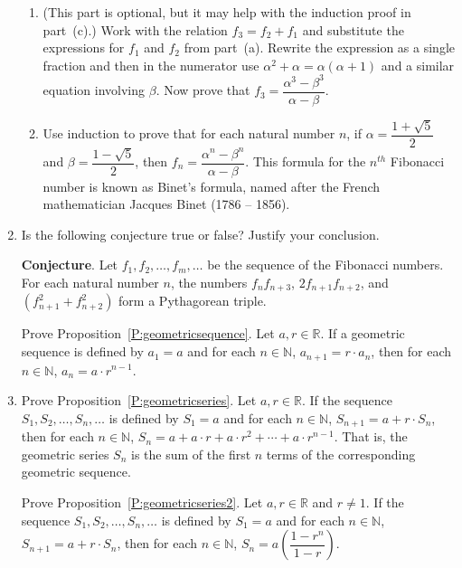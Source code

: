 \begin{enumerate}
\begin{enumerate}
  \item (This part is optional, but it may help with the induction proof in part~(c).)  Work with the relation $f_3 = f_2 + f_1$ and substitute the expressions for $f_1$ and $f_2$ from part~(a).  Rewrite the expression as a single fraction and then in the numerator use $\alpha^2 + \alpha = \alpha ( \alpha + 1 )$ and a similar equation involving $\beta$.  Now prove that $f_3 = \dfrac{\alpha^3 - \beta^3}{\alpha - \beta}$.

  \item Use induction to prove that for each natural number $n$, if $\alpha = \dfrac{1 + \sqrt{5}}{2}$ and 
$\beta = \dfrac{1 - \sqrt{5}}{2}$, then $f_n = \dfrac{\alpha^n - \beta^n}{\alpha - \beta}$.  \note This formula for the 
$n^{th}$ Fibonacci number is known as Binet's formula, 
%
named after the French mathematician Jacques Binet (1786 -- 1856).
\end{enumerate}

\item Is the following conjecture true or false?  Justify your conclusion.

\newpar
\textbf{Conjecture}.  Let $f_1, f_2, \ldots, f_m, \ldots$ be the sequence of the Fibonacci numbers.  For each natural number $n$, the numbers $f_nf_{n+3}$, $2f_{n+1}f_{n+2}$, and 
$\left( f_{n+1}^2 + f_{n+2}^2 \right)$ form a Pythagorean triple.


\xitem Prove Proposition~\ref{P:geometricsequence}.
\label{exer:geomseq}%
Let  $a,r \in \mathbb{R}$.  If a geometric sequence is defined by  $a_1  = a$ and for each  $n \in \mathbb{N}$,  $a_{n + 1}  = r \cdot a_n $, then for each  $n \in \mathbb{N}$,   $a_n  = a \cdot r^{n - 1} $. 

\item Prove Proposition~\ref{P:geometricseries}. 
\label{exer:geomser}%
Let  $a,r \in \mathbb{R}$.  If the sequence  $S_1 ,S_2 , \ldots ,S_n , \ldots $ is defined by  $S_1  = a$ and for each  $n \in \mathbb{N}$,  $S_{n + 1}  = a + r \cdot S_n $, then for each  $n \in \mathbb{N}$,   $S_n  = a + a \cdot r + a \cdot r^2  +  \cdots  + a \cdot r^{n - 1} $.  That is, the geometric series  $S_n $ is the sum of the first  $n$  terms of the corresponding geometric sequence.

\xitem Prove Proposition~\ref{P:geometricseries2}.
\label{exer:geometricseries2}%
Let  $a, r \in \mathbb{R}$ and  $r \ne 1$.  If the sequence  $S_1 ,S_2 , \ldots ,S_n , \ldots $ is defined by  $S_1  = a$ and for each  $n \in \mathbb{N}$,  $S_{n + 1}  = a + r \cdot S_n $, then for each  $n \in \mathbb{N}$,   $S_n  = a\left( {\dfrac{{1 - r^n }}{{1 - r}}} \right)$.



\end{enumerate}
